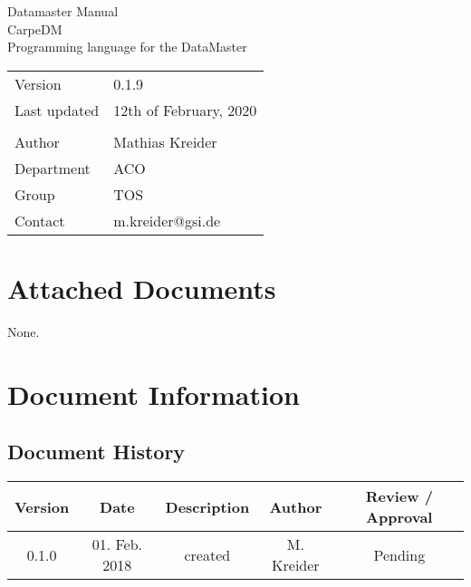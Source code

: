 \documentclass[12pt,a4paper]{report}
\makeatletter
\newcommand{\AppendixA}{dm_memmap}
\newcommand{\AppendixB}{dm_language}
\newcommand{\AppendixC}{dm_troubleshooting}
\newcommand{\DocAuthor}{Mathias Kreider}
\newcommand{\DocContact}{m.kreider@gsi.de}
\newcommand{\DocTitle}{CarpeDM\\Programming language for the DataMaster}
\newcommand{\DocName}{Datamaster Manual}
\newcommand{\DocRev}{12th of February, 2020} %
\newcommand{\DocVer}{0.1.9}
\newcommand{\DocGroup}{TOS}
\newcommand{\DocDept}{ACO}
\newcommand{\DocHist}{
0.1.0 & 01. Feb. 2018 & created & M. Kreider & Pending\\
\hline
}
\makeatother
\begin{document}
\begin{titlepage}
\begin{center}
\vspace{2em} 

\Huge{\DocName}\\[2cm]
\Large{\DocTitle}\\[2cm] 

\begin{large}
\begin{tabularx}{\textwidth}{Xl}
Version & \DocVer\\
Last updated & \DocRev\\
\vspace{1.5cm}\\
Author & \DocAuthor\\
Department & \DocDept\\
Group & \DocGroup\\
Contact & \DocContact
\end{tabularx}%
\end{large}

\vfill

\end{center}
\end{titlepage}



%
%
%
\pagestyle{plain} %
\tableofcontents

\glsunsetall
\setcounter{chapter}{0}












\appendix
\renewcommand{\thechapter}{\Roman{chapter}}
\chapter{Attached Documents}
None.
\begingroup
\raggedright
\sloppy
\printbibliography[heading=bibnumbered]
\endgroup
\chapter{Document Information}
\section{Document History}
\begin{table}[H]
\begin{tabular}{ | c | c | c | c | c |}
\hline
\textbf{Version} & \textbf{Date} & \textbf{Description} & \textbf{Author} & \textbf{Review / Approval} \\
\hline
\DocHist
\hline
\end{tabular}
\end{table}
\end{document}
